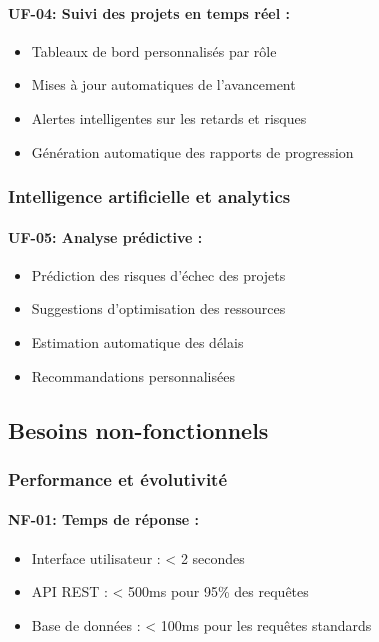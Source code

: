 \paragraph{UF-04: Suivi des projets en temps réel :}
\begin{itemize}
    \item Tableaux de bord personnalisés par rôle
    \item Mises à jour automatiques de l'avancement
    \item Alertes intelligentes sur les retards et risques
    \item Génération automatique des rapports de progression
\end{itemize}

\subsubsection{Intelligence artificielle et analytics}

\paragraph{UF-05: Analyse prédictive :}
\begin{itemize}
    \item Prédiction des risques d'échec des projets
    \item Suggestions d'optimisation des ressources
    \item Estimation automatique des délais
    \item Recommandations personnalisées
\end{itemize}

\subsection{Besoins non-fonctionnels}

\subsubsection{Performance et évolutivité}

\paragraph{NF-01: Temps de réponse :}
\begin{itemize}
    \item Interface utilisateur : < 2 secondes
    \item API REST : < 500ms pour 95\% des requêtes
    \item Base de données : < 100ms pour les requêtes standards
\end{itemize}

